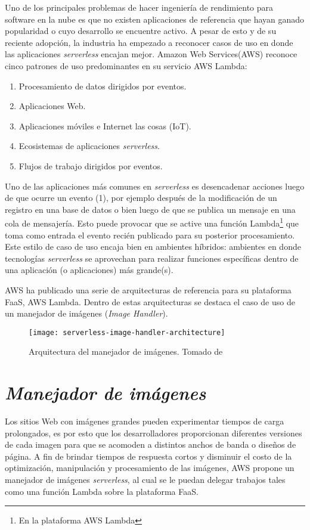 Uno de los principales problemas de hacer ingeniería de rendimiento para software en la nube es que no existen aplicaciones de referencia que hayan ganado popularidad o cuyo desarrollo se encuentre activo. A pesar de esto y de su reciente adopción, la industria ha empezado a reconocer casos de uso en donde las aplicaciones \emph{serverless} encajan mejor. Amazon Web Services(AWS)\cite{serverless-architecture-patterns} reconoce cinco patrones de uso predominantes en su servicio AWS Lambda:
\begin{enumerate}
    \item Procesamiento de datos dirigidos por eventos.
    \item Aplicaciones Web.
    \item Aplicaciones móviles e Internet las cosas (IoT).
    \item Ecosistemas de aplicaciones \emph{serverless}.
    \item Flujos de trabajo dirigidos por eventos.
\end{enumerate}
 
Uno de las aplicaciones más comunes en \emph{serverless} es desencadenar acciones luego de que ocurre un evento (1), por ejemplo después de la modificación de un registro en una base de datos o bien luego de que se publica un mensaje en una cola de mensajería. Esto puede provocar que se active una función Lambda\footnote{En la plataforma AWS Lambda } que toma como entrada el evento recién publicado para su posterior procesamiento. Este estilo de caso de uso encaja bien en ambientes híbridos: ambientes en donde tecnologías \emph{serverless} se aprovechan para realizar funciones específicas dentro de una aplicación (o aplicaciones) más grande(s).

AWS ha publicado una serie de arquitecturas de referencia\cite{aws-lambda-ref-arch} para su plataforma FaaS, AWS Lambda. Dentro de estas arquitecturas se destaca el caso de uso de un manejador de imágenes (\emph{Image Handler})\cite{aws-lambda-image-handler}. 

\begin{figure}[h]
  \centering
  \texttt{[image: serverless-image-handler-architecture]}
  \caption[Arquitectura del manejador de imágenes]{Arquitectura del manejador de imágenes. Tomado de \protect\cite{aws-lambda-image-handler}}
  \label{fig:serverless-image-handler-architecture}
\end{figure}

\section{\emph{Manejador de imágenes}} \label{sec:manejador-imagenes-1}
Los sitios Web con imágenes grandes pueden experimentar tiempos de carga prolongados, es por esto que los desarrolladores proporcionan diferentes versiones de cada imagen para que se acomoden a distintos anchos de banda o diseños de página. A fin de brindar tiempos de respuesta cortos y disminuir el costo de la optimización, manipulación y procesamiento de las imágenes, AWS propone un manejador de imágenes \emph{serverless}, al cual se le puedan delegar trabajos tales como una función Lambda sobre la plataforma FaaS.


